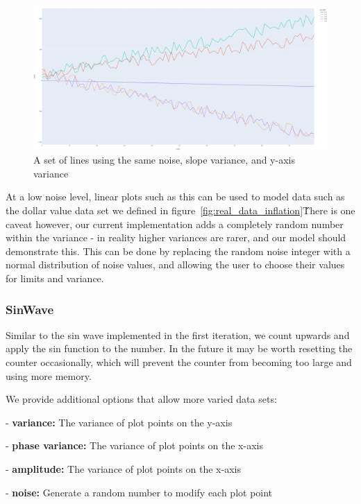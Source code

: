 \begin{figure}[H]
    \centering
    \includegraphics[width=12cm]{figures/data_generation/fake_data_linear_plot}
    \caption{A set of lines using the same noise, slope variance, and y-axis variance}
    \label{fig:datagen_fig_2}
\end{figure}

At a low noise level, linear plots such as this can be used to model data such as the dollar value data set we defined
in figure~\ref{fig:real_data_inflation}\.
There is one caveat however, our current implementation adds a completely random number within the variance - in reality
higher variances are rarer, and our model should demonstrate this.
This can be done by replacing the random noise integer with a normal distribution of noise values, and allowing the user
to choose their values for limits and variance.

\subsubsection{SinWave}

Similar to the sin wave implemented in the first iteration, we count upwards and apply the sin function to the number.
In the future it may be worth resetting the counter occasionally, which will prevent the counter from becoming too large
and using more memory.

We provide additional options that allow more varied data sets:

- \textbf{variance:} The variance of plot points on the y-axis

- \textbf{phase variance:} The variance of plot points on the x-axis

- \textbf{amplitude:} The variance of plot points on the x-axis

- \textbf{noise:} Generate a random number to modify each plot point


